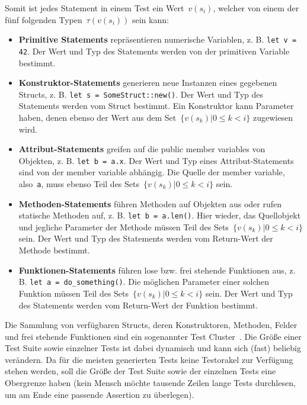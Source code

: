 \documentclass{article}
\begin{document}
Somit ist jedes Statement in einem Test ein Wert~$v(s_i)$, welcher von einem der fünf folgenden Typen~$\tau(v(s_i))$ sein kann:
\begin{itemize} 
	\item \textbf{Primitive Statements} repräsentieren numerische Variablen, z. B. \lstinline{let v = 42}. Der Wert und Typ des Statements werden von der primitiven Variable bestimmt. 
	\item \textbf{Konstruktor-Statements} generieren neue Instanzen eines gegebenen Structs, z. B. \lstinline{let s = SomeStruct::new()}. Der Wert und Typ des Statements werden vom Struct bestimmt. Ein Konstruktor kann Parameter haben, denen ebenso der Wert aus dem Set~$\{v(s_k) | 0 \leq k < i\}$ zugewiesen wird.
	\item \textbf{Attribut-Statements} greifen auf die public member variables von Objekten, z. B. \lstinline{let b = a.x}. Der Wert und Typ eines Attribut-Statements sind von der member variable abhängig. Die Quelle der member variable, also~\lstinline{a}, muss ebenso Teil des Sets~$\{v(s_k) | 0 \leq k < i\}$ sein. 
	\item \textbf{Methoden-Statements} führen Methoden auf Objekten aus oder rufen statische Methoden auf, z. B. \lstinline{let b = a.len()}. Hier wieder, das Quellobjekt und jegliche Parameter der Methode müssen Teil des Sets~$\{v(s_k) | 0 \leq k < i\}$ sein. Der Wert und Typ des Statements werden vom Return-Wert der Methode bestimmt. 
	\item \textbf{Funktionen-Statements} führen lose bzw. frei stehende Funktionen aus, z. B. \lstinline{let a = do_something()}. Die möglichen Parameter einer solchen Funktion müssen Teil des Sets~$\{v(s_k) | 0 \leq k < i\}$ sein. Der Wert und Typ des Statements werden vom Return-Wert der Funktion bestimmt. 
\end{itemize}

Die Sammlung von verfügbaren Structs, deren Konstruktoren, Methoden, Felder und frei stehende Funktionen sind ein sogenannter Test Cluster~\cite{Fraser_2011}. Die Größe einer Test Suite sowie einzelner Tests ist dabei dynamisch und kann sich (fast) beliebig verändern. Da für die meisten generierten Tests keine Testorakel zur Verfügung stehen werden, soll die Größe der Test Suite sowie der einzelnen Tests eine Obergrenze haben (kein Mensch möchte tausende Zeilen lange Tests durchlesen, um am Ende eine passende Assertion zu überlegen). 
\end{document}
